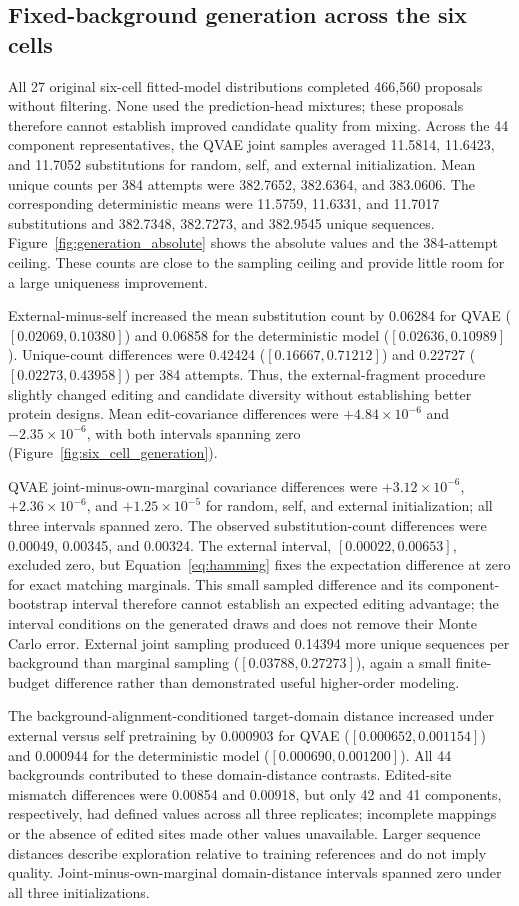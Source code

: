 \documentclass[referee,pdflatex,sn-vancouver-num]{sn-jnl}
\begin{document}
\subsection{Fixed-background generation across the six cells}
All 27 original six-cell fitted-model distributions completed 466,560 proposals without filtering. None used the prediction-head mixtures; these proposals therefore cannot establish improved candidate quality from mixing. Across the 44 component representatives, the QVAE joint samples averaged 11.5814, 11.6423, and 11.7052 substitutions for random, self, and external initialization. Mean unique counts per 384 attempts were 382.7652, 382.6364, and 383.0606. The corresponding deterministic means were 11.5759, 11.6331, and 11.7017 substitutions and 382.7348, 382.7273, and 382.9545 unique sequences. Figure~\ref{fig:generation_absolute} shows the absolute values and the 384-attempt ceiling. These counts are close to the sampling ceiling and provide little room for a large uniqueness improvement.

External-minus-self increased the mean substitution count by 0.06284 for QVAE ($[0.02069,0.10380]$) and 0.06858 for the deterministic model ($[0.02636,0.10989]$). Unique-count differences were 0.42424 ($[0.16667,0.71212]$) and 0.22727 ($[0.02273,0.43958]$) per 384 attempts. Thus, the external-fragment procedure slightly changed editing and candidate diversity without establishing better protein designs. Mean edit-covariance differences were $+4.84\times10^{-6}$ and $-2.35\times10^{-6}$, with both intervals spanning zero (Figure~\ref{fig:six_cell_generation}).

QVAE joint-minus-own-marginal covariance differences were $+3.12\times10^{-6}$, $+2.36\times10^{-6}$, and $+1.25\times10^{-5}$ for random, self, and external initialization; all three intervals spanned zero. The observed substitution-count differences were 0.00049, 0.00345, and 0.00324. The external interval, $[0.00022,0.00653]$, excluded zero, but Equation~\ref{eq:hamming} fixes the expectation difference at zero for exact matching marginals. This small sampled difference and its component-bootstrap interval therefore cannot establish an expected editing advantage; the interval conditions on the generated draws and does not remove their Monte Carlo error. External joint sampling produced 0.14394 more unique sequences per background than marginal sampling ($[0.03788,0.27273]$), again a small finite-budget difference rather than demonstrated useful higher-order modeling.

The background-alignment-conditioned target-domain distance increased under external versus self pretraining by 0.000903 for QVAE ($[0.000652,0.001154]$) and 0.000944 for the deterministic model ($[0.000690,0.001200]$). All 44 backgrounds contributed to these domain-distance contrasts. Edited-site mismatch differences were 0.00854 and 0.00918, but only 42 and 41 components, respectively, had defined values across all three replicates; incomplete mappings or the absence of edited sites made other values unavailable. Larger sequence distances describe exploration relative to training references and do not imply quality. Joint-minus-own-marginal domain-distance intervals spanned zero under all three initializations.
\end{document}
